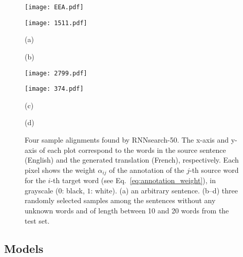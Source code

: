 \begin{figure}[t]
    \centering
    \begin{minipage}[b]{0.48\textwidth}
        \raggedleft
        \texttt{[image: EEA.pdf]}
    \end{minipage}
    \hfill
    \begin{minipage}[b]{0.48\textwidth}
        \raggedleft
        \texttt{[image: 1511.pdf]}
    \end{minipage}

    \begin{minipage}{0.48\textwidth}
        \centering
        (a)
    \end{minipage}
    \hfill
    \begin{minipage}{0.48\textwidth}
        \centering
        (b)
    \end{minipage}

    \begin{minipage}[b]{0.48\textwidth}
        \raggedleft
        \texttt{[image: 2799.pdf]}
    \end{minipage}
    \hfill
    \begin{minipage}[b]{0.48\textwidth}
        \raggedleft
        \texttt{[image: 374.pdf]}
    \end{minipage}

    \begin{minipage}{0.48\textwidth}
        \centering
        (c)
    \end{minipage}
    \hfill
    \begin{minipage}{0.48\textwidth}
        \centering
        (d)
    \end{minipage}

    \caption{
        Four sample alignments found by RNNsearch-50. The x-axis and y-axis of
        each plot correspond to the words in the source sentence (English) and
        the generated translation (French), respectively. Each pixel shows the
        weight $\alpha_{ij}$ of the annotation of the $j$-th source word for the
        $i$-th target word (see Eq.~\eqref{eq:annotation_weight}), in grayscale
        ($0$: black, $1$: white). (a) an arbitrary sentence. (b--d) three
        randomly selected samples among the sentences without any unknown words
        and of length between 10 and 20 words from the test set.
    }
    \label{fig:alignment}
\end{figure}

\subsection{Models}

